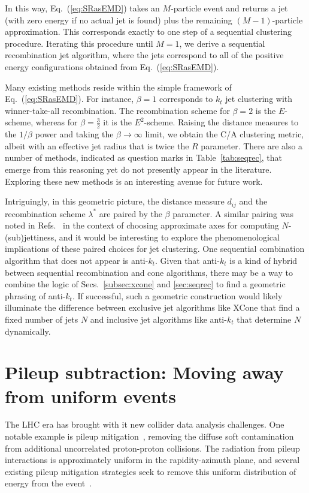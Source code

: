 \documentclass[letterpaper,11pt]{article}
\DeclareRobustCommand{\Secs}[2]{Secs.~\ref{#1} and \ref{#2}}
\DeclareRobustCommand{\Tab}[1]{Table~\ref{#1}}
\DeclareRobustCommand{\Eq}[1]{Eq.~(\ref{#1})}
\DeclareRobustCommand{\Refs}[1]{Refs.~\cite{#1}}
\begin{document}
In this way, \Eq{eq:SRasEMD} takes an $M$-particle event and returns a jet (with zero energy if no actual jet is found) plus the remaining $(M-1)$-particle approximation.
%
This corresponds exactly to one step of a sequential clustering procedure.
%
Iterating this procedure until $M = 1$, we derive a sequential recombination jet algorithm, where the jets correspond to all of the positive energy configurations obtained from \Eq{eq:SRasEMD}.


Many existing methods reside within the simple framework of \Eq{eq:SRasEMD}.
%
For instance, $\beta=1$ corresponds to $k_t$ jet clustering with winner-take-all recombination.
%
The recombination scheme for $\beta=2$ is the $E$-scheme, whereas for $\beta=\frac32$ it is the $E^2$-scheme.
%
Raising the distance measures to the $1/\beta$ power and taking the $\beta\to\infty$ limit, we obtain the C/A clustering metric, albeit with an effective jet radius that is twice the $R$ parameter.
%
There are also a number of methods, indicated as question marks in \Tab{tab:seqrec}, that emerge from this reasoning yet do not presently appear in the literature.
%
Exploring these new methods is an interesting avenue for future work.


Intriguingly, in this geometric picture, the distance measure $d_{ij}$ and the recombination scheme $\lambda^*$ are paired by the $\beta$ parameter.
%
A similar pairing was noted in \Refs{Stewart:2015waa,Dasgupta:2015lxh} in the context of choosing approximate axes for computing $N$-(sub)jettiness, and it would be interesting to explore the phenomenological implications of these paired choices for jet clustering.
%
One sequential combination algorithm that does not appear is anti-$k_t$.
%
Given that anti-$k_t$ is a kind of hybrid between sequential recombination and cone algorithms, there may be a way to combine the logic of \Secs{subsec:xcone}{sec:seqrec} to find a geometric phrasing of anti-$k_t$.
%
If successful, such a geometric construction would likely illuminate the difference between exclusive jet algorithms like XCone that find a fixed number of jets $N$ and inclusive jet algorithms like anti-$k_t$ that determine $N$ dynamically.



\section{Pileup subtraction: Moving away from uniform events}
\label{sec:pileup}


The LHC era has brought with it new collider data analysis challenges.
%
One notable example is pileup mitigation~\cite{Soyez:2018opl}, removing the diffuse soft contamination from additional uncorrelated proton-proton collisions.
%
The radiation from pileup interactions is approximately uniform in the rapidity-azimuth plane, and several existing pileup mitigation strategies seek to remove this uniform distribution of energy from the event~\cite{Cacciari:2007fd,Krohn:2013lba,Cacciari:2014jta,Cacciari:2014gra,Bertolini:2014bba,Berta:2014eza,Komiske:2017ubm,Monk:2018clo,Martinez:2018fwc}.
\end{document}
